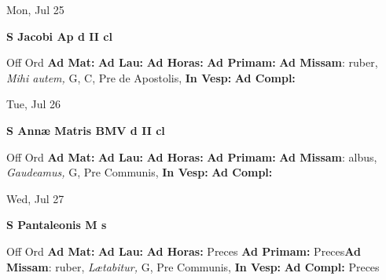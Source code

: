 \documentclass[10pt]{book}
\begin{document}
\begin{center}
\begin{minipage}{3.5in}
\vspace{2em}
\begin{center}Mon, Jul 25
\end{center}
\textbf{ \large S Jacobi Ap
\textnormal{\normalsize d II cl}}

\begin{justify}Off Ord
\textbf{Ad Mat: }
\textbf{Ad Lau: }
\textbf{Ad Horas: }
\textbf{Ad Primam: }\textbf{Ad Missam}: ruber, \textit{Mihi autem,} G, C, Pre de Apostolis, 
\textbf{In Vesp: }
\textbf{Ad Compl: }
\end{justify}
\end{minipage}
\end{center}

\begin{center}
\begin{minipage}{3.5in}
\vspace{2em}
\begin{center}Tue, Jul 26
\end{center}
\textbf{ \large S Annæ Matris BMV
\textnormal{\normalsize d II cl}}

\begin{justify}Off Ord
\textbf{Ad Mat: }
\textbf{Ad Lau: }
\textbf{Ad Horas: }
\textbf{Ad Primam: }\textbf{Ad Missam}: albus, \textit{Gaudeamus,} G, Pre Communis, 
\textbf{In Vesp: }
\textbf{Ad Compl: }
\end{justify}
\end{minipage}
\end{center}

\begin{center}
\begin{minipage}{3.5in}
\vspace{2em}
\begin{center}Wed, Jul 27
\end{center}
\textbf{ \large S Pantaleonis M
\textnormal{\normalsize s}}

\begin{justify}Off Ord
\textbf{Ad Mat: }
\textbf{Ad Lau: }
\textbf{Ad Horas: }Preces
\textbf{Ad Primam: }Preces\textbf{Ad Missam}: ruber, \textit{Lætabitur,} G, Pre Communis, 
\textbf{In Vesp: }
\textbf{Ad Compl: }Preces
\end{justify}
\end{minipage}
\end{center}
\end{document}
